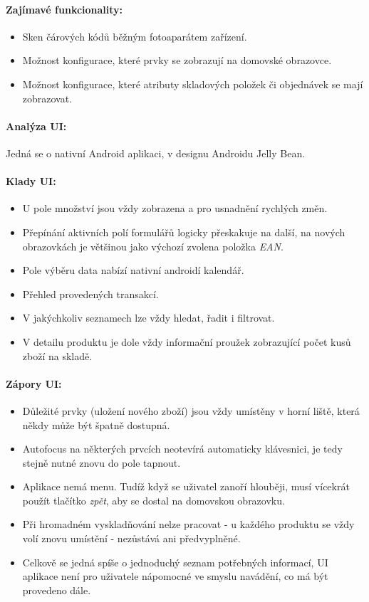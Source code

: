 \paragraph{Zajímavé funkcionality:}
\begin{itemize}
	\item Sken čárových kódů běžným fotoaparátem zařízení.
	\item Možnost konfigurace, které prvky se zobrazují na domovské obrazovce.
	\item Možnost konfigurace, které atributy skladových položek či objednávek se mají zobrazovat.
\end{itemize}

\paragraph{Analýza UI:} Jedná se o nativní Android aplikaci, v designu Androidu Jelly Bean. 

\paragraph{Klady UI:}
\begin{itemize}
	\item U pole množství jsou vždy zobrazena \uv{+} a \uv{-} pro usnadnění rychlých změn.
	\item Přepínání aktivních polí formulářů logicky přeskakuje na další, na nových obrazovkách je většinou jako výchozí zvolena položka \emph{EAN}.
	\item Pole výběru data nabízí nativní androidí kalendář.
	\item Přehled provedených transakcí.
	\item V jakýchkoliv seznamech lze vždy hledat, řadit i filtrovat.
	\item V detailu produktu je dole vždy informační proužek zobrazující počet kusů zboží na skladě.
\end{itemize}

\paragraph{Zápory UI:}
\begin{itemize}
	\item Důležité prvky (uložení nového zboží) jsou vždy umístěny v horní liště, která někdy může být špatně dostupná.
	\item Autofocus na některých prvcích neotevírá automaticky klávesnici, je tedy stejně nutné znovu do pole tapnout.
	\item Aplikace nemá menu. Tudíž když se uživatel zanoří hlouběji, musí vícekrát použít tlačítko \emph{zpět}, aby se dostal na domovskou obrazovku.
	\item Při hromadném vyskladňování nelze pracovat  - u každého produktu se vždy volí znovu umístění - nezůstává ani předvyplněné.
	\item Celkově se jedná spíše o jednoduchý seznam potřebných informací, UI aplikace není pro uživatele nápomocné ve smyslu navádění, co má být provedeno dále.
\end{itemize}

